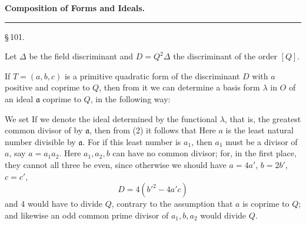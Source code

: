 \begin{center}

\textbf{Composition of Forms and Ideals.}

\rule{0.2\linewidth}{0.4pt}

\S\,101. 
\end{center}

Let $\Delta$ be the field discriminant and $D = Q^2\Delta$ the discriminant of the order $[Q]$.

If $T = (a, b, c)$ is a primitive quadratic form of the discriminant $D$ %
 with $a$ positive and coprime to $Q$, then from it we can determine a basis form $\lambda$ in $O$ of an ideal $\mathfrak{a}$ coprime to $Q$, in the following way:

We set
If we denote the ideal determined by the functional $\lambda$, that is, the greatest common divisor of
by $\mathfrak{a}$, then from (2) it follows that
Here $a$ is the least natural number divisible by $\mathfrak{a}$. For if this least number is $a_1$, then $a_1$ must be a divisor of $a$, say $a = a_1 a_2$. Here $a_1, a_2, b$ can have no common divisor; for, in the first place, they cannot all three be even, since otherwise we should have $a = 4a'$, $b = 2b'$, $c = c'$,
\[
D = 4(b'^2 - 4a'c)
\]
and 4 would have to divide $Q$, contrary to the assumption that $a$ is coprime to $Q$; and likewise an odd common prime divisor of $a_1, b, a_2$ would divide $Q$.
